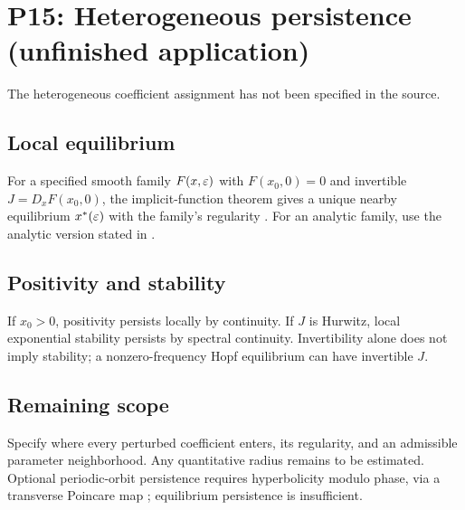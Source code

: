 \section{P15: Heterogeneous persistence (unfinished application)}
\label{sec:P15}
The heterogeneous coefficient assignment has not been specified in the source.
\subsection{Local equilibrium}\label{slot:P15-1}
For a specified smooth family $F(x,\varepsilon)$ with $F(x_0,0)=0$ and
invertible $J=D_xF(x_0,0)$, the implicit-function theorem gives a
unique nearby equilibrium $x^*(\varepsilon)$ with the family's regularity
\cite[Ch.~1]{GuckenheimerHolmes1983}. For an analytic family, use the
analytic version stated in \cite[\S3.2]{GreenbaumLiOverton2020}.
\subsection{Positivity and stability}\label{slot:P15-2}
If $x_0>0$, positivity persists locally by continuity. If $J$ is
Hurwitz, local exponential stability persists by spectral continuity.
Invertibility alone does not imply stability; a nonzero-frequency Hopf
equilibrium can have invertible $J$.
\subsection{Remaining scope}\label{slot:P15-3}
Specify where every perturbed coefficient enters, its regularity, and an
admissible parameter neighborhood. Any quantitative radius remains to be
estimated. Optional periodic-orbit persistence requires hyperbolicity
modulo phase, via a transverse Poincare map
\cite[Ch.~1]{GuckenheimerHolmes1983}; equilibrium persistence is insufficient.
